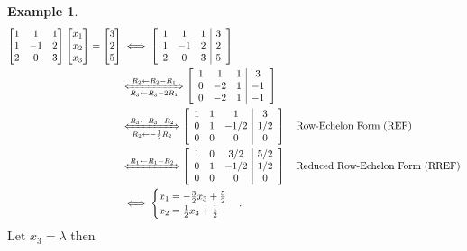 \documentclass[12pt,openany]{book}
\theoremstyle{definition}
\newtheorem{example}{Example}[chapter]
\begin{document}
	\begin{example}
		\begin{align*}
			\begin{bmatrix}
				1 & 1 & 1\\ 1 & -1& 2\\ 2 & 0 & 3
			\end{bmatrix}\begin{bmatrix}
				x_1\\ x_2\\ x_3
			\end{bmatrix}=\begin{bmatrix}
				3 \\ 2 \\ 5
			\end{bmatrix} &\iff \left[
			\begin{array}{ccc|c}
				1 & 1 & 1 & 3\\
				1 & -1 & 2 & 2\\
				2 & 0 & 3 & 5
			\end{array}
			\right] \\ &\xLeftrightarrow[R_3\gets R_3-2R_1]{R_2\gets R_2-R_1} \left[
			\begin{array}{ccc|c}
				1 & 1 & 1 & 3\\
				0 & -2 & 1 & -1\\
				0 & -2 & 1 & -1
			\end{array} 
			\right] \\
			&\xLeftrightarrow[R_2\gets -\frac{1}{2}R_2]{R_3\gets R_3-R_2} \left[
			\begin{array}{ccc|c}
				1 & 1 & 1 & 3\\
				0 & 1 & -1/2 & 1/2\\
				0 & 0 & 0 & 0
			\end{array} 
			\right]\quad\text{Row-Echelon Form (REF)} \\
			&\xLeftrightarrow{R_1\gets R_1-R_2} \left[
			\begin{array}{ccc|c}
				1 & 0 & 3/2 & 5/2\\
				0 & 1 & -1/2 & 1/2\\
				0 & 0 & 0 & 0
			\end{array} 
			\right]\quad\text{Reduced Row-Echelon Form (RREF)} \\
			&\iff \begin{cases}
				x_1=-\frac{3}{2}x_3+\frac{5}{2}\\
				x_2=\frac{1}{2}x_3+\frac{1}{2}
			\end{cases}.
		\end{align*} Let $x_3=\lambda$ then \[
\]
\end{example}
\end{document}
